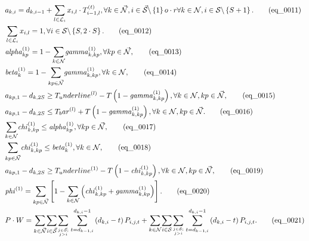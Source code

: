 \begin{align}
  & a_{k , i} = d_{k , i - 1} + \sum_{l \in \mathcal{L}_{i}} x_{i , l} \cdot T_{i - 1 , l}^{\left(t\right)} , \forall k \in \vec{\mathcal{N}} , i \in \vec{\mathcal{S}} \backslash \left\{1\right\} o \cdot r \forall k \in {\mathcal{N}} , i \in {\mathcal{S}} \backslash \left\{S + 1\right\} . \tag{eq\_0011} \\
  & \sum_{l \in \mathcal{L}_{i}} x_{i , l} = 1 , \forall i \in \mathcal{S} \backslash \left\{S , 2 \cdot S\right\} . \tag{eq\_0012} \\
  & \mathit{alpha}_{kp}^{\left(1\right)} = 1 - \underset{k \in {\mathcal{N}}}{\sum} \mathit{gamma}_{k , kp}^{\left(1\right)} , \forall kp \in \vec{\mathcal{N}} , \tag{eq\_0013} \\
  & \mathit{beta}_{k}^{\left(1\right)} = 1 - \underset{kp \in \vec{\mathcal{N}}}{\sum} \mathit{gamma}_{k , kp}^{\left(1\right)} , \forall k \in {\mathcal{N}} , \tag{eq\_0014} \\
  & a_{kp , 1} - d_{k , 2 S} \geq T_underline^{\left(l\right)} - T \left(1 - \mathit{gamma}_{k , kp}^{\left(1\right)}\right) , \forall k \in {\mathcal{N}} , kp \in \vec{\mathcal{N}} , \tag{eq\_0015} \\
  & a_{kp , 1} - d_{k , 2 S} \leq T_bar^{\left(l\right)} + T \left(1 - \mathit{gamma}_{k , kp}^{\left(1\right)}\right) , \forall k \in {\mathcal{N}} , kp \in \vec{\mathcal{N}} . \tag{eq\_0016} \\
  & \underset{k \in {\mathcal{N}}}{\sum} \mathit{chi}_{k , kp}^{\left(1\right)} \leq \mathit{alpha}_{kp}^{\left(1\right)} , \forall kp \in \vec{\mathcal{N}} , \tag{eq\_0017} \\
  & \underset{kp \in \vec{\mathcal{N}}}{\sum} \mathit{chi}_{k , kp}^{\left(1\right)} \leq \mathit{beta}_{k}^{\left(1\right)} , \forall k \in {\mathcal{N}} , \tag{eq\_0018} \\
  & a_{kp , 1} - d_{k , 2 S} \geq T_underline^{\left(1\right)} - T \left(1 - \mathit{chi}_{k , kp}^{\left(1\right)}\right) , \forall k \in {\mathcal{N}} , kp \in \vec{\mathcal{N}} , \tag{eq\_0019} \\
  & \mathit{phi}^{\left(1\right)} = \underset{kp \in \vec{\mathcal{N}}}{\sum} \left[1 - \underset{k \in {\mathcal{N}}}{\sum} \left(\mathit{chi}_{k , kp}^{\left(1\right)} + \mathit{gamma}_{k , kp}^{\left(1\right)}\right)\right] . \tag{eq\_0020} \\
  & P \cdot W = \underset{k \in \vec{\mathcal{N}}}{\sum} \underset{i \in \vec{\mathcal{S}}}{\sum} \underset{\genfrac{}{}{0pt}{}{j \in \vec{\mathcal{S}} ;}{j > i}}{\sum} \sum_{t = d_{k - 1 , i}}^{d_{k , i} - 1} \left(d_{k , i} - t\right) P_{i , j , t} + \underset{k \in {\mathcal{N}}}{\sum} \underset{i \in {\mathcal{S}}}{\sum} \underset{\genfrac{}{}{0pt}{}{j \in {\mathcal{S}} ;}{j > i}}{\sum} \sum_{t = d_{k - 1 , i}}^{d_{k , i} - 1} \left(d_{k , i} - t\right) P_{i , j , t} . \tag{eq\_0021} \\

\end{align}
